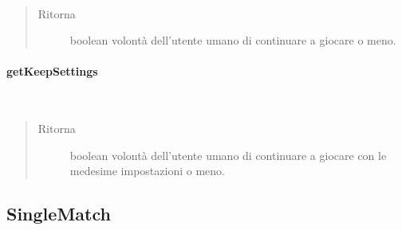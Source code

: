 \documentclass[letterpaper,10pt,italian]{sphinxmanual}
\begin{document}
\begin{fulllineitems}
\label{\detokenize{source/it/unicam/cs/pa/mastermind/gamecore/NewGameStats:it.unicam.cs.pa.mastermind.gamecore.NewGameStats.getContinue()}}~\begin{quote}\begin{description}
\item[{Ritorna}] \leavevmode
boolean volontà dell’utente umano di continuare a giocare o meno.

\end{description}\end{quote}

\end{fulllineitems}



\paragraph{getKeepSettings}
\label{\detokenize{source/it/unicam/cs/pa/mastermind/gamecore/NewGameStats:getkeepsettings}}

\begin{fulllineitems}
\label{\detokenize{source/it/unicam/cs/pa/mastermind/gamecore/NewGameStats:it.unicam.cs.pa.mastermind.gamecore.NewGameStats.getKeepSettings()}}~\begin{quote}\begin{description}
\item[{Ritorna}] \leavevmode
boolean volontà dell’utente umano di continuare a giocare con le medesime impostazioni o meno.

\end{description}\end{quote}

\end{fulllineitems}



\subsection{SingleMatch}
\label{\detokenize{source/it/unicam/cs/pa/mastermind/gamecore/SingleMatch:singlematch}}\label{\detokenize{source/it/unicam/cs/pa/mastermind/gamecore/SingleMatch::doc}}
\end{document}
